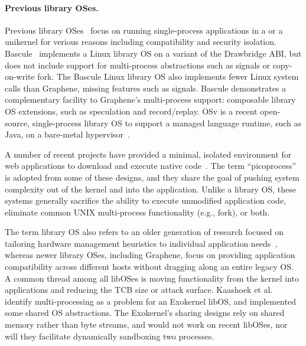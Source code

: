 




\paragraph{Previous library OSes.}
Previous library OSes~\citep{porter11drawbridge,xax,unikernels,baumann13bascule,osv}
focus on running single-process applications
in a \picoproc{} or a unikernel
for verious reasons including compatibility and security isolation.
Bascule~\citep{baumann13bascule} implements a Linux library OS on a variant of the Drawbridge ABI,
but does not include support for multi-process abstractions such as signals or copy-on-write fork.
The Bascule Linux library OS also implements fewer Linux system calls than Graphene, missing
features such as signals.
Bascule demonstrates a complementary facility to Graphene's multi-process support: composable library OS extensions, 
such as speculation and record/replay.
OSv is a recent open-source, %
single-process 
library OS to support a managed language runtime, such as Java, on a bare-metal hypervisor~\citep{osv}.


A number of recent projects have provided a minimal, isolated environment
for web applications to download and execute native code~\citep{nacl,xax,howell13refactoring,gazelle,atlantis}.
The term ``picoprocess'' is adopted from some of these designs, and they share 
the goal of pushing system complexity out of the kernel and into the application.
Unlike a library OS, these systems
generally sacrifice the ability to execute unmodified application code, 
eliminate common UNIX multi-process functionality (e.g., fork), or both.


The term library OS also refers to an older generation of research
focused on tailoring hardware management heuristics 
to individual application needs~\citep{kaashoek97exokernel,anderson92libos,cheriton94cache,leslie96nemesis,libra},
whereas newer library OSes, including Graphene, focus
on providing application compatibility
across different hosts without dragging along an entire legacy OS.
A common thread among all libOSes is moving functionality from the kernel
into applications and reducing the TCB size or attack surface.
Kaashoek et al.~\citep{kaashoek97exokernel} identify multi-processing as a problem for an Exokernel libOS,
and implemented some shared OS abstractions.
The Exokernel's sharing designs rely on shared memory rather than byte streams,
and would not work on recent libOSes,
nor will they facilitate dynamically sandboxing two processes.

